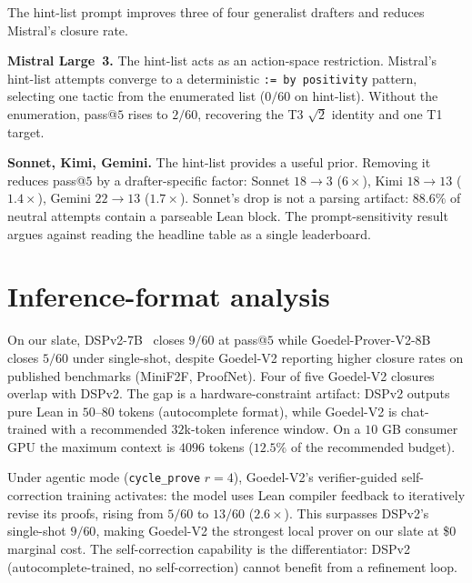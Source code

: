 The hint-list prompt improves three of four generalist drafters and
reduces Mistral's closure rate.

\textbf{Mistral Large~3.} The hint-list acts as an action-space
restriction. Mistral's hint-list attempts converge to a deterministic
\texttt{:= by positivity} pattern, selecting one tactic from the
enumerated list ($0/60$ on hint-list). Without the enumeration,
pass@$5$ rises to $2/60$, recovering the T3 $\sqrt{2}$ identity
and one T1 target.

\textbf{Sonnet, Kimi, Gemini.} The hint-list provides a useful
prior. Removing it reduces pass@$5$ by a drafter-specific factor:
Sonnet $18 \to 3$ ($6\times$), Kimi $18 \to 13$ ($1.4\times$),
Gemini $22 \to 13$ ($1.7\times$). Sonnet's drop is not a parsing
artifact: $88.6\%$ of neutral attempts contain a parseable Lean
block. The prompt-sensitivity result argues
against reading the headline table as a single leaderboard.

\section{Inference-format analysis}
\label{app:inference-format}

On our slate, DSPv2-7B~\cite{dspv22025} closes $9/60$ at pass@$5$
while Goedel-Prover-V2-8B~\cite{goedelprover2025} closes $5/60$
under single-shot, despite Goedel-V2 reporting higher closure rates
on published benchmarks (MiniF2F, ProofNet). Four of five Goedel-V2
closures overlap with DSPv2. The gap is a hardware-constraint
artifact: DSPv2 outputs pure Lean in $50$--$80$ tokens (autocomplete
format), while Goedel-V2 is chat-trained with a recommended
$32$k-token inference window. On a $10$ GB consumer GPU the maximum
context is $4096$ tokens ($12.5\%$ of the recommended budget).

Under agentic mode (\texttt{cycle\_prove} $r{=}4$), Goedel-V2's
verifier-guided self-correction training activates: the model uses
Lean compiler feedback to iteratively revise its proofs, rising from
$5/60$ to $13/60$ ($2.6\times$). This surpasses DSPv2's single-shot
$9/60$, making Goedel-V2 the strongest local prover on our slate at
\$0 marginal cost. The self-correction capability is the
differentiator: DSPv2 (autocomplete-trained, no self-correction)
cannot benefit from a refinement loop.
